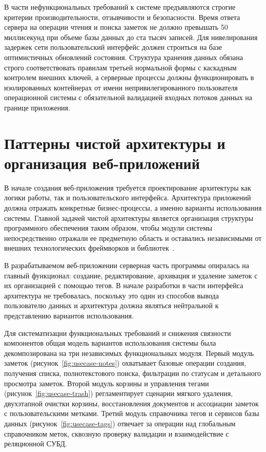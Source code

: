 \documentclass[a4paper,14pt]{extreport}
\begin{document}
В части нефункциональных требований к системе предъявляются строгие критерии производительности, отзывчивости и безопасности. Время ответа сервера на операции чтения и поиска заметок не должно превышать 50 миллисекунд при объеме базы данных до ста тысяч записей. Для нивелирования задержек сети пользовательский интерфейс должен строиться на базе оптимистичных обновлений состояния. Структура хранения данных обязана строго соответствовать правилам третьей нормальной формы с каскадным контролем внешних ключей, а серверные процессы должны функционировать в изолированных контейнерах от имени непривилегированного пользователя операционной системы с обязательной валидацией входных потоков данных на границе приложения.

\section{Паттерны чистой архитектуры и организация веб-приложений}

В начале создания веб-приложения требуется проектирование архитектуры как логики работы, так и пользовательского интерфейса. Архитектура приложений должна отражать конкретные бизнес-процессы, а именно варианты использования системы. Главной задачей чистой архитектуры является организация структуры программного обеспечения таким образом, чтобы модули системы непосредственно отражали ее предметную область и оставались независимыми от внешних технологических фреймворков и библиотек~\cite{ref_martin}.

В разрабатываемом веб-приложении серверная часть программы опиралась на главный функционал: создание, редактирование, архивация и удаление заметок с их организацией с помощью тегов. В начале разработки в части интерфейса архитектура не требовалась, поскольку это один из способов вывода пользователю данных и архитектура должна являться нейтральной к представлению вариантов использования.

Для систематизации функциональных требований и снижения связности компонентов общая модель вариантов использования системы была декомпозирована на три независимых функциональных модуля. Первый модуль заметок (рисунок~\ref{fig:usecase-notes}) охватывает базовые операции создания, получения списка, полнотекстового поиска, фильтрации по статусам и детального просмотра заметок. Второй модуль корзины и управления тегами (рисунок~\ref{fig:usecase-trash}) регламентирует сценарии мягкого удаления, двухэтапной очистки корзины, восстановления документов и ассоциации заметок с пользовательскими метками. Третий модуль справочника тегов и сервисов базы данных (рисунок~\ref{fig:usecase-tags}) отвечает за операции над глобальным справочником меток, сквозную проверку валидации и взаимодействие с реляционной СУБД.
\end{document}
